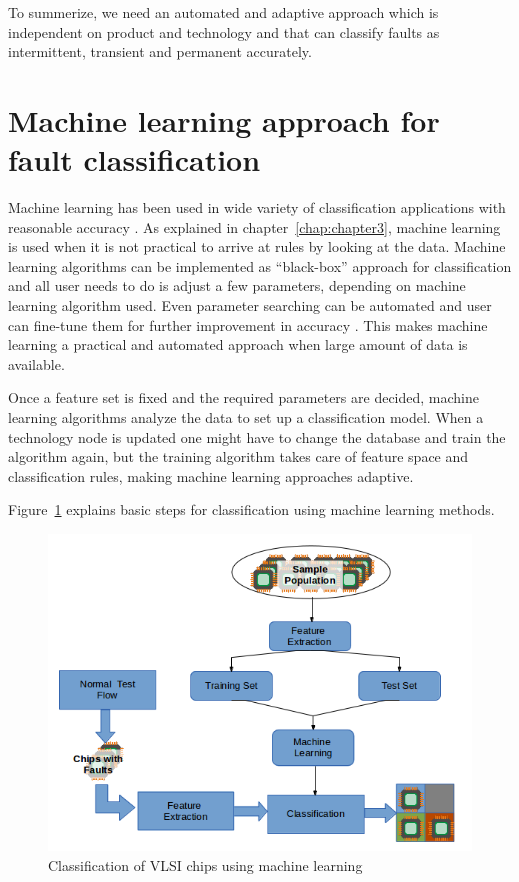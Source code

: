 To summerize, we need an automated and adaptive approach which is independent on product and technology and that can classify faults as intermittent, transient and permanent accurately. 

\section{Machine learning approach for fault classification}

Machine learning has been used in wide variety of classification applications with reasonable accuracy \cite{Pang2002,Nguyen2008,Sebastiani2002, Kotsiantis2007}. As explained in chapter~\ref{chap:chapter3}, machine learning is used when it is not practical to arrive at rules by looking at the data. Machine learning algorithms can be implemented as \enquote{black-box} approach for classification and all user needs to do is adjust a few parameters, depending on machine learning algorithm used. Even parameter searching can be automated and user can fine-tune them for further improvement in accuracy \cite{Hsu2003, Castillo2000}. This makes machine learning a practical and automated approach when large amount of data is available.

Once a feature set is fixed and the required parameters are decided, machine learning algorithms analyze the data to set up a classification model. When a technology node is updated one might have to change the database and train the algorithm again, but the training algorithm takes care of feature space and classification rules, making machine learning approaches adaptive.

Figure~\ref{fig:mlsteps} explains basic steps for classification using machine learning methods.

\begin{figure}[h]
  \begin{center}
    \captionsetup{justification=centering}
    \includegraphics[scale=0.65]{figures/mlsteps.png}
    \caption{Classification of VLSI chips using machine learning}
    \label{fig:mlsteps}
  \end{center}
\end{figure}

